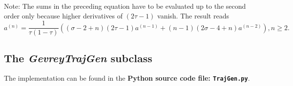 \documentclass[a4paper,12pt,headinclude=true,headsepline,parskip=half,DIV=12]{scrartcl}
\newcommand{\py}{Python\xspace}
\newcommand{\code}[1]{\lstinline[basicstyle=\normalsize\sffamily]|#1|}
\begin{document}
\begin{appendices}
  Note: The sums in the preceding equation have to be evaluated up to the second order only because higher derivatives of $(2\tau-1)$ vanish. The result reads
  \begin{equation*}
    a^{(n)}=\frac{1}{\tau(1-\tau)}\left((\sigma-2+n)(2\tau-1)a^{(n-1)}+(n-1)(2\sigma-4+n)a^{(n-2)}\right), n\ge 2.
  \end{equation*}
  
  
  
  \subsection{The \emph{GevreyTrajGen} subclass}
  The implementation can be found in the \textbf{\py source code file: \code{TrajGen.py}}.
\end{appendices}

\nocite{KnollPython21}


\printbibliography
\end{document}
